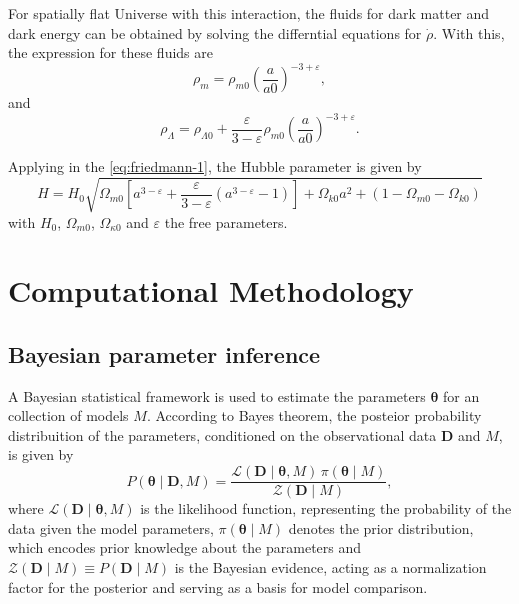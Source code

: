 \documentclass[final,3p,times]{elsarticle}
\begin{document}
For spatially flat Universe with this interaction, the fluids for dark matter and dark energy can be obtained by solving the differntial equations for $\dot{\rho}$. With this, the expression for these fluids are
\begin{equation}
    \rho_m = \rho_{m0}\left(\frac{a}{a0}\right)^{-3 + \varepsilon},
\end{equation}
and
\begin{equation}
    \rho_{\Lambda} = \rho_{\Lambda 0} + \frac{\varepsilon}{3 - \varepsilon}\rho_{m0}\left(\frac{a}{a0}\right)^{-3 + \varepsilon}.
\end{equation}

Applying in the \eqref{eq:friedmann-1}, the Hubble parameter is given by
\begin{equation}
    H = H_0 \sqrt{ \Omega_{m0} \left[ a^{3-\varepsilon} + \frac{\varepsilon}{3-\varepsilon}\left(a^{3-\varepsilon}-1\right) \right] + \Omega_{k0}a^2 + (1 - \Omega_{m0} - \Omega_{k0}) }
    \label{eq:Hz_ide_curvature_revised}
\end{equation}
with $H_0$, $\Omega_{m0}$, $\Omega_{\kappa0}$ and $\varepsilon$ the free parameters.

\section{Computational Methodology}
\label{sec:methodology}
\subsection{Bayesian parameter inference}
\label{subsec:baysian_inference}

A Bayesian statistical framework is used to estimate the parameters $\boldsymbol{\theta}$ for an collection of models $M$.
According to Bayes theorem, the posteior probability distribuition of the parameters, conditioned on the observational data $\mathbf{D}$ and $M$, is given by
\begin{equation}
    P(\boldsymbol{\theta} \mid \mathbf{D}, M) = \frac{\mathcal{L}(\mathbf{D} \mid \boldsymbol{\theta}, M)\, \pi(\boldsymbol{\theta} \mid M)}{\mathcal{Z}(\mathbf{D} \mid M)},
    \label{eq:bayes_theorem}
\end{equation}
where $\mathcal{L}(\mathbf{D} \mid \boldsymbol{\theta}, M)$ is the likelihood function, representing the probability of the data given the model parameters, $\pi(\boldsymbol{\theta} \mid M)$ denotes the prior distribution, which encodes prior knowledge about the parameters and $\mathcal{Z}(\mathbf{D} \mid M) \equiv P(\mathbf{D} \mid M)$ is the Bayesian evidence, acting as a normalization factor for the posterior and serving as a basis for model comparison.
\end{document}
